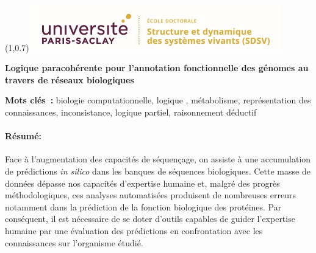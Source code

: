 \documentclass[univ]{thesis}
\begin{document}
    \thispagestyle{empty}
    \begin{textblock}{3}(1,0.7)
        \includegraphics[height=2cm]{img/logo_ecole_doctorale.png}
    \end{textblock}
    \begin{mdframed}[linecolor=psviolet, linewidth=2pt, innerleftmargin=10, innerrightmargin=30, innertopmargin=10, innerbottommargin=50, font=\tiny]
        {\small \textbf{Logique paracohérente pour l’annotation fonctionnelle des génomes au travers de réseaux biologiques}}
        
        \noindent\textbf{Mots clés :} biologie computationnelle, logique , métabolisme, représentation des connaissances, inconsistance, logique partiel, raisonnement déductif
        
        \begin{multicols}{2}            
            \paragraph*{\textbf{Résumé:} }Face à l’augmentation des capacités de séquençage, on assiste à une accumulation de prédictions \textit{in silico} dans les banques de séquences biologiques. Cette masse de données dépasse nos capacités d’expertise humaine et, malgré des progrès méthodologiques, ces analyses automatisées produisent de nombreuses erreurs notamment dans la prédiction de la fonction biologique des protéines. Par conséquent, il est nécessaire de se doter d’outils capables de guider l’expertise humaine par une évaluation des prédictions en confrontation avec les connaissances sur l’organisme étudié. 
            

\end{multicols}
\end{mdframed}
\end{document}
